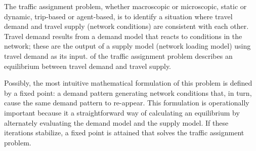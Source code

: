 







The traffic assignment problem, whether macroscopic or
microscopic, static or dynamic, trip-based or agent-based, is to
identify a situation where travel demand and travel supply (network
conditions) are consistent with each other. Travel demand results
from a demand model that reacts to conditions in the network; these 
 are the output of a supply model
(network loading model) using travel demand as its input. 
 of the traffic assignment problem describes an 
equilibrium between travel demand and travel supply.

Possibly, the most intuitive mathematical formulation of this problem is 
defined by a fixed point:  a demand pattern generating network 
conditions that, in turn, cause the same demand pattern to re-appear. This 
formulation is operationally important because it  a
straightforward way of calculating an equilibrium by alternately evaluating the demand 
model and the supply model. If these iterations stabilize, a fixed 
point is attained that solves the traffic assignment problem.

